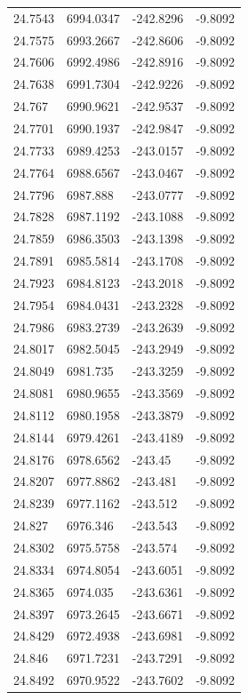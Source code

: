 \begin{table}[H]
\begin{tabular}{llll}
24.7543 & 6994.0347 & -242.8296 & -9.8092 \\
24.7575 & 6993.2667 & -242.8606 & -9.8092 \\
24.7606 & 6992.4986 & -242.8916 & -9.8092 \\
24.7638 & 6991.7304 & -242.9226 & -9.8092 \\
24.767 & 6990.9621 & -242.9537 & -9.8092 \\
24.7701 & 6990.1937 & -242.9847 & -9.8092 \\
24.7733 & 6989.4253 & -243.0157 & -9.8092 \\
24.7764 & 6988.6567 & -243.0467 & -9.8092 \\
24.7796 & 6987.888 & -243.0777 & -9.8092 \\
24.7828 & 6987.1192 & -243.1088 & -9.8092 \\
24.7859 & 6986.3503 & -243.1398 & -9.8092 \\
24.7891 & 6985.5814 & -243.1708 & -9.8092 \\
24.7923 & 6984.8123 & -243.2018 & -9.8092 \\
24.7954 & 6984.0431 & -243.2328 & -9.8092 \\
24.7986 & 6983.2739 & -243.2639 & -9.8092 \\
24.8017 & 6982.5045 & -243.2949 & -9.8092 \\
24.8049 & 6981.735 & -243.3259 & -9.8092 \\
24.8081 & 6980.9655 & -243.3569 & -9.8092 \\
24.8112 & 6980.1958 & -243.3879 & -9.8092 \\
24.8144 & 6979.4261 & -243.4189 & -9.8092 \\
24.8176 & 6978.6562 & -243.45 & -9.8092 \\
24.8207 & 6977.8862 & -243.481 & -9.8092 \\
24.8239 & 6977.1162 & -243.512 & -9.8092 \\
24.827 & 6976.346 & -243.543 & -9.8092 \\
24.8302 & 6975.5758 & -243.574 & -9.8092 \\
24.8334 & 6974.8054 & -243.6051 & -9.8092 \\
24.8365 & 6974.035 & -243.6361 & -9.8092 \\
24.8397 & 6973.2645 & -243.6671 & -9.8092 \\
24.8429 & 6972.4938 & -243.6981 & -9.8092 \\
24.846 & 6971.7231 & -243.7291 & -9.8092 \\
24.8492 & 6970.9522 & -243.7602 & -9.8092 \\

\end{tabular}
\end{table}
